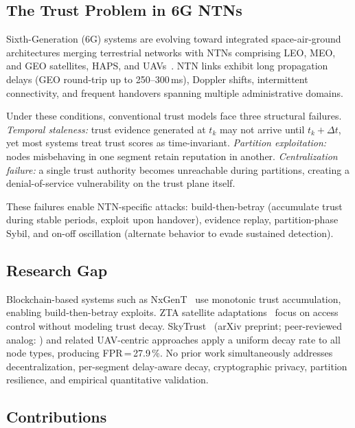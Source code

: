 \documentclass[journal,twoside,10pt]{IEEEtran}
\begin{document}
\subsection{The Trust Problem in 6G NTNs}

Sixth-Generation (6G) systems are evolving toward integrated
space-air-ground architectures merging terrestrial networks with NTNs
comprising LEO, MEO, and GEO satellites, HAPS, and UAVs~\cite{giordani2020}.
NTN links exhibit long propagation delays (GEO round-trip up to
250--300\,ms), Doppler shifts, intermittent connectivity, and frequent
handovers spanning multiple administrative domains.

Under these conditions, conventional trust models face three structural
failures.
\emph{Temporal staleness:} trust evidence generated at $t_k$ may not
arrive until $t_k\!+\!\Delta t$, yet most systems treat trust scores
as time-invariant.
\emph{Partition exploitation:} nodes misbehaving in one segment retain
reputation in another.
\emph{Centralization failure:} a single trust authority becomes
unreachable during partitions, creating a denial-of-service
vulnerability on the trust plane itself.

These failures enable NTN-specific attacks: build-then-betray
(accumulate trust during stable periods, exploit upon handover),
evidence replay, partition-phase Sybil, and on-off oscillation
(alternate behavior to evade sustained detection).

\subsection{Research Gap}

Blockchain-based systems such as NxGenT~\cite{nxgent} use monotonic
trust accumulation, enabling build-then-betray exploits.
ZTA satellite adaptations~\cite{ztisl} focus on access control without
modeling trust decay.
SkyTrust~\cite{uav_fl} (arXiv preprint; peer-reviewed analog:
\cite{tong2024}) and related UAV-centric approaches apply a uniform
decay rate to all node types, producing FPR\,=\,27.9\,\%.
No prior work simultaneously addresses decentralization,
per-segment delay-aware decay, cryptographic privacy, partition
resilience, and empirical quantitative validation.

\subsection{Contributions}
\end{document}
